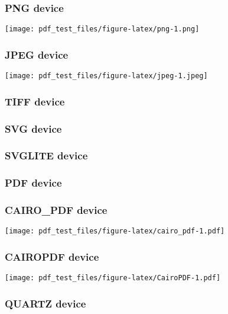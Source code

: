\documentclass[]{article}
\begin{document}
\subsubsection{PNG device}\label{png-device}

\texttt{[image: pdf\_test\_files/figure-latex/png-1.png]}

\subsubsection{JPEG device}\label{jpeg-device}

\texttt{[image: pdf\_test\_files/figure-latex/jpeg-1.jpeg]}

\subsubsection{TIFF device}\label{tiff-device}

\subsubsection{SVG device}\label{svg-device}

\subsubsection{SVGLITE device}\label{svglite-device}

\subsubsection{PDF device}\label{pdf-device}

\subsubsection{CAIRO\_PDF device}\label{cairoux5fpdf-device}

\texttt{[image: pdf\_test\_files/figure-latex/cairo\_pdf-1.pdf]}

\subsubsection{CAIROPDF device}\label{cairopdf-device}

\texttt{[image: pdf\_test\_files/figure-latex/CairoPDF-1.pdf]}

\subsubsection{QUARTZ device}\label{quartz-device}
\end{document}
